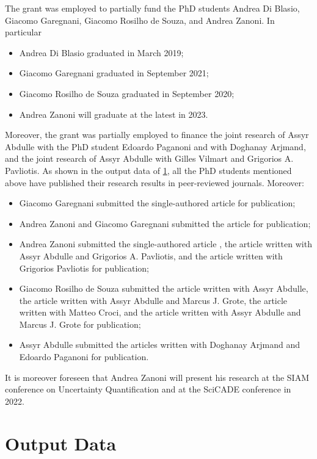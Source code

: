 \documentclass[10pt]{article}
\begin{document}
The grant was employed to partially fund the PhD students Andrea Di Blasio, Giacomo Garegnani, Giacomo Rosilho de Souza, and Andrea Zanoni. In particular
\begin{itemize}
	\item Andrea Di Blasio graduated in March 2019;
	\item Giacomo Garegnani graduated in September 2021;
	\item Giacomo Rosilho de Souza graduated in September 2020; 
	\item Andrea Zanoni will graduate at the latest in 2023.
\end{itemize}
Moreover, the grant was partially employed to finance the joint research of Assyr Abdulle  with the PhD student Edoardo Paganoni and with Doghanay Arjmand, and the joint research of Assyr Abdulle with Gilles Vilmart and Grigorios A. Pavliotis. As shown in the output data of \cref{sec:Output}, all the PhD students mentioned above have published their research results in peer-reviewed journals. Moreover:
\begin{itemize}
	\item Giacomo Garegnani submitted the single-authored article \cite{Gar21b} for publication;
	\item Andrea Zanoni and Giacomo Garegnani submitted the article \cite{GaZ21} for publication;
	\item Andrea Zanoni submitted the single-authored article \cite{Zan21}, the article \cite{APZ21} written with Assyr Abdulle and Grigorios A. Pavliotis, and the article \cite{PaZ21} written with Grigorios Pavliotis for publication;
	\item Giacomo Rosilho de Souza submitted the article \cite{AbR20c} written with Assyr Abdulle, the article \cite{AGR20} written with Assyr Abdulle and Marcus J. Grote, the article \cite{CrR21} written with Matteo Croci, and the article \cite{AGR21} written with Assyr Abdulle and Marcus J. Grote for publication;
	\item Assyr Abdulle submitted the articles \cite{AAP20,AAP20b} written with Doghanay Arjmand and Edoardo Paganoni for publication.
\end{itemize}
It is moreover foreseen that Andrea Zanoni will present his research at the SIAM conference on Uncertainty Quantification and at the SciCADE conference in 2022.




\clearpage
\section{Output Data}\label{sec:Output}
\end{document}
